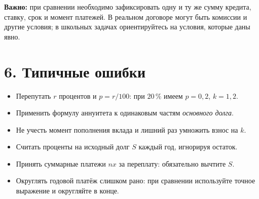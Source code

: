 \documentclass[a4paper,12pt]{article}
\newcommand{\key}[1]{\textcolor{darkaccent}{\textbf{#1}}}
\newcommand{\pct}{\,\%}
\begin{document}
\key{Важно:} при сравнении необходимо зафиксировать одну и ту же сумму кредита, ставку, срок и момент платежей. В реальном договоре могут быть комиссии и другие условия; в школьных задачах ориентируйтесь на условия, которые даны явно.

\section*{6. Типичные ошибки}
\begin{itemize}
\item Перепутать $r$ процентов и $p=r/100$: при $20\pct$ имеем $p=0{,}2$, $k=1{,}2$.
\item Применить формулу аннуитета к одинаковым частям \emph{основного долга}.
\item Не учесть момент пополнения вклада и лишний раз умножить взнос на $k$.
\item Считать проценты на исходный долг $S$ каждый год, игнорируя остаток.
\item Принять суммарные платежи $nx$ за переплату: обязательно вычтите $S$.
\item Округлять годовой платёж слишком рано: при сравнении используйте точное выражение и округляйте в конце.
\end{itemize}

\clearpage
\end{document}
